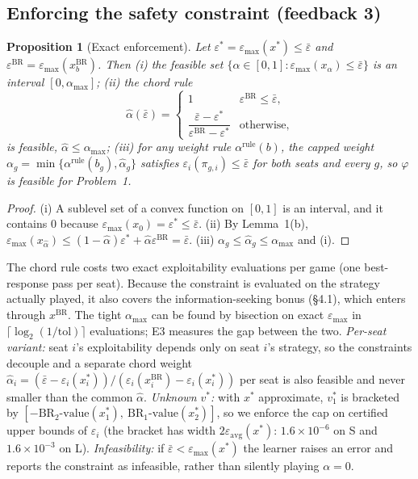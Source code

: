 \documentclass[11pt]{article}
\newtheorem{proposition}{Proposition}
\newcommand{\eps}{\varepsilon}
\newcommand{\epsbar}{\bar{\eps}}
\newcommand{\emax}{\eps_{\max}}
\newcommand{\BR}{\mathrm{BR}}
\newcommand{\new}[1]{\textcolor{blue!55!black}{#1}}
\begin{document}
\new{\subsection{Enforcing the safety constraint (feedback 3)}
\begin{proposition}[Exact enforcement]
Let $\eps^*=\emax(x^*)\le\epsbar$ and $\eps^{\BR}=\emax(x^{\BR}_{b})$. Then (i) the feasible set $\{\alpha\in[0,1]:\emax(x_\alpha)\le\epsbar\}$ is an interval $[0,\alpha_{\max}]$; (ii) the \emph{chord rule}
\[
\hat\alpha(\epsbar)=\begin{cases}1 & \eps^{\BR}\le\epsbar,\\ \dfrac{\epsbar-\eps^*}{\eps^{\BR}-\eps^*} & \text{otherwise,}\end{cases}
\]
is feasible, $\hat\alpha\le\alpha_{\max}$; (iii) for any weight rule $\alpha^{\text{rule}}(b)$, the capped weight $\alpha_g=\min\{\alpha^{\text{rule}}(b_g),\hat\alpha_g\}$ satisfies $\eps_i(\pi_{g,i})\le\epsbar$ \emph{for both seats} and every $g$, so $\varphi$ is feasible for Problem~1.
\end{proposition}
\begin{proof}
(i) A sublevel set of a convex function on $[0,1]$ is an interval, and it contains $0$ because $\emax(x_0)=\eps^*\le\epsbar$. (ii) By Lemma~1(b), $\emax(x_{\hat\alpha})\le(1-\hat\alpha)\eps^*+\hat\alpha\eps^{\BR}=\epsbar$. (iii) $\alpha_g\le\hat\alpha_g\le\alpha_{\max}$ and (i).
\end{proof}
The chord rule costs two exact exploitability evaluations per game (one best-response pass per seat). Because the constraint is evaluated on the strategy actually played, it also covers the information-seeking bonus (\S4.1), which enters through $x^{\BR}$. The tight $\alpha_{\max}$ can be found by bisection on exact $\emax$ in $\lceil\log_2(1/\mathrm{tol})\rceil$ evaluations; E3 measures the gap between the two. \emph{Per-seat variant:} seat $i$'s exploitability depends only on seat $i$'s strategy, so the constraints decouple and a separate chord weight $\hat\alpha_i=(\epsbar-\eps_i(x^*_i))/(\eps_i(x^{\BR}_i)-\eps_i(x^*_i))$ per seat is also feasible and never smaller than the common $\hat\alpha$. \emph{Unknown $v^*$:} with $x^*$ approximate, $v_1^*$ is bracketed by $[-\BR_2\text{-value}(x^*_1),\ \BR_1\text{-value}(x^*_2)]$, so we enforce the cap on certified upper bounds of $\eps_i$ (the bracket has width $2\eps_{\mathrm{avg}}(x^*)$: $1.6\times10^{-6}$ on S and $1.6\times10^{-3}$ on L). \emph{Infeasibility:} if $\epsbar<\emax(x^*)$ the learner raises an error and reports the constraint as infeasible, rather than silently playing $\alpha=0$.
}
\end{document}

